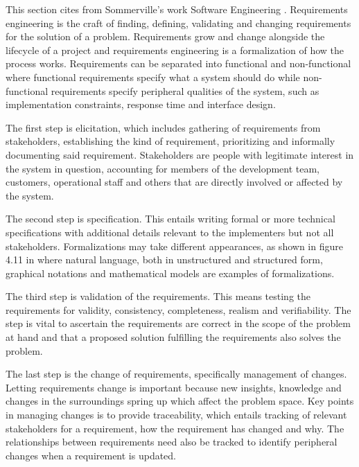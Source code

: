 This section cites from Sommerville's work Software Engineering
\cite{sommerville-software-engineering}. Requirements engineering
is the craft of finding, defining, validating and changing
requirements for the solution of a problem. Requirements grow and
change alongside the lifecycle of a project and requirements
engineering is a formalization of how the process works.
Requirements can be separated into functional and non-functional
where functional requirements specify what a system should do while
non-functional requirements specify peripheral qualities of the
system, such as implementation constraints, response time and
interface design.

The first step is elicitation, which includes gathering of
requirements from stakeholders, establishing the kind of
requirement, prioritizing and informally documenting said
requirement. Stakeholders are people with legitimate interest in
the system in question, accounting for members of the development
team, customers, operational staff and others that are directly
involved or affected by the system. 

The second step is specification. This entails writing formal or
more technical specifications with additional details relevant to
the implementers but not all stakeholders. Formalizations may take
different appearances, as shown in figure 4.11 in
\cite{sommerville-software-engineering} where natural language,
both in unstructured and structured form, graphical notations and
mathematical models are examples of formalizations.

The third step is validation of the requirements. This means
testing the requirements for validity, consistency, completeness,
realism and verifiability. The step is vital to ascertain the
requirements are correct in the scope of the problem at hand and
that a proposed solution fulfilling the requirements also solves
the problem.

The last step is the change of requirements, specifically
management of changes. Letting requirements change is important
because new insights, knowledge and changes in the surroundings
spring up which affect the problem space. Key points in managing
changes is to provide traceability, which entails tracking of
relevant stakeholders for a requirement, how the requirement has
changed and why. The relationships between requirements need also
be tracked to identify peripheral changes when a requirement is
updated.
